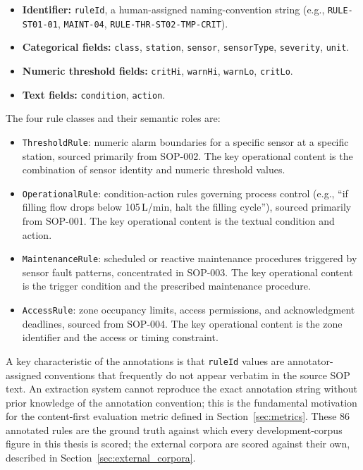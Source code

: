 \documentclass[11pt]{article}
\begin{document}
\begin{itemize}
    \item \textbf{Identifier:} \texttt{ruleId}, a human-assigned
          naming-convention string (e.g., \texttt{RULE-ST01-01},
          \texttt{MAINT-04}, \texttt{RULE-THR-ST02-TMP-CRIT}).
    \item \textbf{Categorical fields:} \texttt{class}, \texttt{station},
          \texttt{sensor}, \texttt{sensorType}, \texttt{severity}, \texttt{unit}.
    \item \textbf{Numeric threshold fields:} \texttt{critHi}, \texttt{warnHi},
          \texttt{warnLo}, \texttt{critLo}.
    \item \textbf{Text fields:} \texttt{condition}, \texttt{action}.
\end{itemize}

The four rule classes and their semantic roles are:
\begin{itemize}
    \item \texttt{ThresholdRule}: numeric alarm boundaries for a specific sensor
          at a specific station, sourced primarily from SOP-002.
          The key operational content is the combination of
          sensor identity and numeric threshold values.
    \item \texttt{OperationalRule}: condition-action rules governing process
          control (e.g., ``if filling flow drops below 105\,L/min, halt the
          filling cycle''), sourced primarily from SOP-001.
          The key operational content is the textual condition and action.
    \item \texttt{MaintenanceRule}: scheduled or reactive maintenance procedures
          triggered by sensor fault patterns, concentrated in SOP-003.
          The key operational content is the trigger condition and the
          prescribed maintenance procedure.
    \item \texttt{AccessRule}: zone occupancy limits, access permissions, and
          acknowledgment deadlines, sourced from SOP-004.
          The key operational content is the zone identifier and the
          access or timing constraint.
\end{itemize}

A key characteristic of the annotations is that \texttt{ruleId} values are
annotator-assigned conventions that frequently do not appear verbatim in the
source SOP text.
An extraction system cannot reproduce the exact annotation string without
prior knowledge of the annotation convention; this is the fundamental motivation
for the content-first evaluation metric defined in
Section~\ref{sec:metrics}.
These 86 annotated rules are the ground truth against which every
development-corpus figure in this thesis is scored; the external corpora are
scored against their own, described in Section~\ref{sec:external_corpora}.
\end{document}
